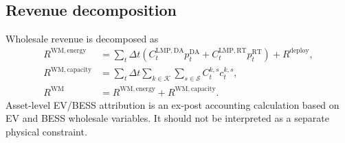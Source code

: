 \documentclass[final,5p,times]{elsarticle}
\newcommand{\DeltaT}{\Delta t}
\newcommand{\DA}{\mathrm{DA}}
\newcommand{\RT}{\mathrm{RT}}
\newcommand{\WM}{\mathrm{WM}}
\newcommand{\energy}{\mathrm{energy}}
\newcommand{\capacity}{\mathrm{capacity}}
\newcommand{\calK}{\mathcal{K}}
\newcommand{\calS}{\mathcal{S}}
\begin{document}
\subsection{Revenue decomposition}
Wholesale revenue is decomposed as
\begin{align}
R^{\WM,\energy}&=\sum_t\DeltaT\left(C_t^{\mathrm{LMP},\DA}p_t^{\DA}+C_t^{\mathrm{LMP},\RT}p_t^{\RT}\right)+R^{\mathrm{deploy}},\label{eq:app_energy_rev}\\
R^{\WM,\capacity}&=\sum_t\DeltaT\sum_{k\in\calK}\sum_{s\in\calS}C_t^{k,s}c_t^{k,s},\label{eq:app_capacity_rev}\\
R^{\WM}&=R^{\WM,\energy}+R^{\WM,\capacity}.\label{eq:app_total_rev}
\end{align}
Asset-level EV/BESS attribution is an ex-post accounting calculation based on EV and BESS wholesale variables. It should not be interpreted as a separate physical constraint.






\end{document}
